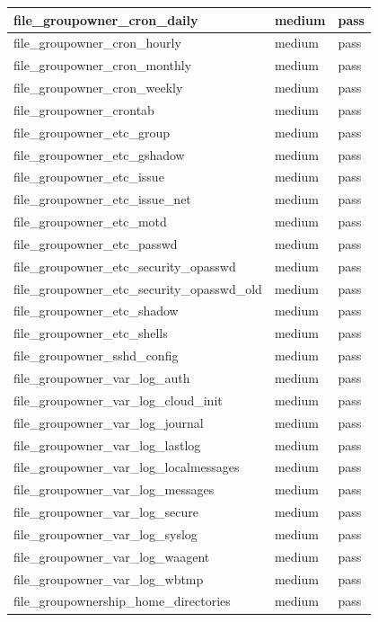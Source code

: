 \begin{longtable}{|p{10cm}|p{2cm}|p{2cm}|}
\hline
file\_groupowner\_cron\_daily & medium & pass \\
\hline
file\_groupowner\_cron\_hourly & medium & pass \\
\hline
file\_groupowner\_cron\_monthly & medium & pass \\
\hline
file\_groupowner\_cron\_weekly & medium & pass \\
\hline
file\_groupowner\_crontab & medium & pass \\
\hline
file\_groupowner\_etc\_group & medium & pass \\
\hline
file\_groupowner\_etc\_gshadow & medium & pass \\
\hline
file\_groupowner\_etc\_issue & medium & pass \\
\hline
file\_groupowner\_etc\_issue\_net & medium & pass \\
\hline
file\_groupowner\_etc\_motd & medium & pass \\
\hline
file\_groupowner\_etc\_passwd & medium & pass \\
\hline
file\_groupowner\_etc\_security\_opasswd & medium & pass \\
\hline
file\_groupowner\_etc\_security\_opasswd\_old & medium & pass \\
\hline
file\_groupowner\_etc\_shadow & medium & pass \\
\hline
file\_groupowner\_etc\_shells & medium & pass \\
\hline
file\_groupowner\_sshd\_config & medium & pass \\
\hline
file\_groupowner\_var\_log\_auth & medium & pass \\
\hline
file\_groupowner\_var\_log\_cloud\_init & medium & pass \\
\hline
file\_groupowner\_var\_log\_journal & medium & pass \\
\hline
file\_groupowner\_var\_log\_lastlog & medium & pass \\
\hline
file\_groupowner\_var\_log\_localmessages & medium & pass \\
\hline
file\_groupowner\_var\_log\_messages & medium & pass \\
\hline
file\_groupowner\_var\_log\_secure & medium & pass \\
\hline
file\_groupowner\_var\_log\_syslog & medium & pass \\
\hline
file\_groupowner\_var\_log\_waagent & medium & pass \\
\hline
file\_groupowner\_var\_log\_wbtmp & medium & pass \\
\hline
file\_groupownership\_home\_directories & medium & pass \\

\end{longtable}
